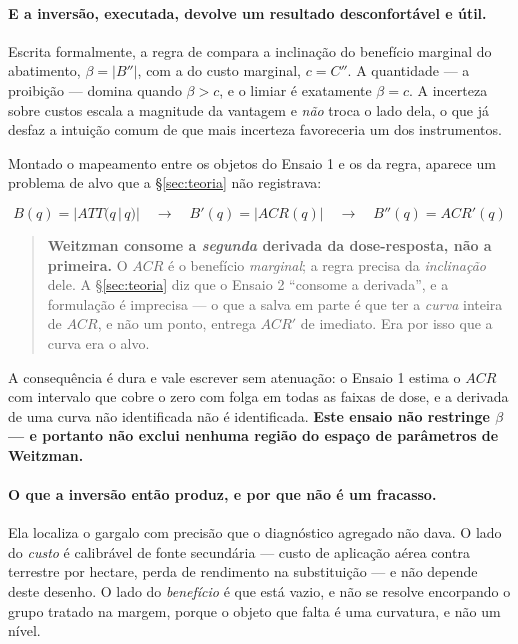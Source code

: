\paragraph{E a inversão, executada, devolve um resultado desconfortável e útil.}
Escrita formalmente, a regra de \citet{weitzman1974} compara a inclinação do
benefício marginal do abatimento, \(\beta = |B''|\), com a do custo marginal,
\(c = C''\). A quantidade --- a proibição --- domina quando \(\beta > c\), e o
limiar é exatamente \(\beta = c\). A incerteza sobre custos escala a magnitude da
vantagem e \emph{não} troca o lado dela, o que já desfaz a intuição comum de que
mais incerteza favoreceria um dos instrumentos.

Montado o mapeamento entre os objetos do Ensaio 1 e os da regra, aparece um
problema de alvo que a §\ref{sec:teoria} não registrava:

\[
B(q) = |ATT(q\,|\,q)| \quad\longrightarrow\quad
B'(q) = |ACR(q)| \quad\longrightarrow\quad
B''(q) = ACR'(q)
\]

\begin{quote}
\textbf{Weitzman consome a \emph{segunda} derivada da dose-resposta, não a
primeira.} O \(ACR\) é o benefício \emph{marginal}; a regra precisa da
\emph{inclinação} dele. A §\ref{sec:teoria} diz que o Ensaio 2 ``consome a
derivada'', e a formulação é imprecisa --- o que a salva em parte é que ter a
\emph{curva} inteira de \(ACR\), e não um ponto, entrega \(ACR'\) de imediato.
Era por isso que a curva era o alvo.
\end{quote}

A consequência é dura e vale escrever sem atenuação: o Ensaio 1 estima o \(ACR\)
com intervalo que cobre o zero com folga em todas as faixas de dose, e a derivada
de uma curva não identificada não é identificada. \textbf{Este ensaio não
restringe \(\beta\) --- e portanto não exclui nenhuma região do espaço de
parâmetros de Weitzman.}

\paragraph{O que a inversão então produz, e por que não é um fracasso.}
Ela localiza o gargalo com precisão que o diagnóstico agregado não dava. O lado
do \emph{custo} é calibrável de fonte secundária --- custo de aplicação aérea
contra terrestre por hectare, perda de rendimento na substituição --- e não
depende deste desenho. O lado do \emph{benefício} é que está vazio, e não se
resolve encorpando o grupo tratado na margem, porque o objeto que falta é uma
curvatura, e não um nível.

